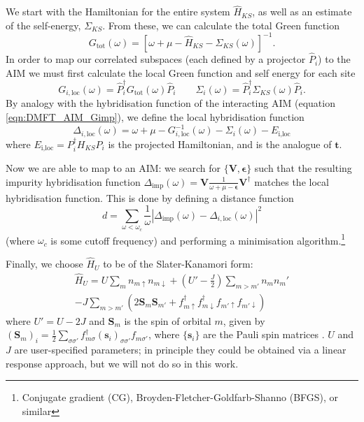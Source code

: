 \documentclass[10pt,a4paper,final]{article}
\newcommand{\nline}{\nonumber \\}
\begin{document}
We start with the Hamiltonian for the entire system $\hat H_{KS}$, as well as an estimate of the self-energy, $\Sigma_{KS}$. From these, we can calculate the total Green function
%
\begin{equation}
G_\text{tot}(\omega)=[\omega+\mu-\hat H_{KS}-\Sigma_{KS}(\omega)]^{-1}.
\end{equation}
%
In order to map our correlated subspaces (each defined by a projector $\hat P_i$) to the AIM we must first calculate the local Green function and self energy for each site
%
\begin{equation}
G_{i,\text{loc}}(\omega) = \hat P_i^\dag G_\text{tot}(\omega) \hat P_i \qquad \Sigma_i(\omega) = \hat P_i^\dag \Sigma_{KS}(\omega) \hat P_i.
\end{equation}
%
By analogy with the hybridisation function of the interacting AIM (equation \ref{eqn:DMFT_AIM_Gimp}), we define the local hybridisation function
%
\begin{equation}
\Delta_{i,\text{loc}}(\omega) = \omega + \mu - G_{i,\text{loc}}^{-1}(\omega) -\Sigma_i(\omega)- E_\text{i,loc}
\end{equation}
%
where $E_\text{i,loc} = P_i^\dag H_{KS} P_i$ is the projected Hamiltonian, and is the analogue of $\mathbf t$.


Now we are able to map to an AIM: we search for $\{\mathbf V, \boldsymbol{\epsilon}\}$ such that the resulting impurity hybridisation function $\Delta_\text{imp}(\omega) = \mathbf V\frac{1}{\omega+\mu-\boldsymbol{\epsilon}}\mathbf V^{\dag}$ matches the local hybridisation function. This is done by defining a distance function
%
\begin{equation}
d = \sum_{\omega < \omega_c}\frac{1}{\omega} | \Delta_\text{imp}(\omega) - \Delta_{i,\text{loc}}(\omega)|^2
\label{eqn:DMFT_distance_function}
\end{equation}
%
(where $\omega_c$ is some cutoff frequency) and performing a minimisation algorithm.\footnote{Conjugate gradient (CG), Broyden-Fletcher-Goldfarb-Shanno (BFGS), or similar}

Finally, we choose $\hat H_U$ to be of the Slater-Kanamori form:
%
\begin{align}
\hat H_U = U\sum_m n_{m\uparrow}n_{m\downarrow}
+ \left(U'-\frac{J}{2}\right) \sum_{m>m'} n_m n_m' \nline
- J \sum_{m>m'} (2\mathbf S_m\mathbf S_{m'}+
f^\dag_{m\uparrow}f^\dag_{m\downarrow}
f_{m'\uparrow}f_{m'\downarrow})
\end{align}
%
where $U' = U - 2J$ and $\mathbf S_m$ is the spin of orbital $m$, given by $(\mathbf S_m)_i = \frac{1}{2}\sum_{\sigma\sigma'}f^\dag_{m\sigma}(\mathbf s_i)_{\sigma\sigma'}f_{m\sigma'}$, where $\{\mathbf s_i\}$ are the Pauli spin matrices \cite{Slater1936a, Kanamori1959a}. $U$ and $J$ are user-specified parameters; in principle they could be obtained via a linear response approach, but we will not do so in this work.
\end{document}
